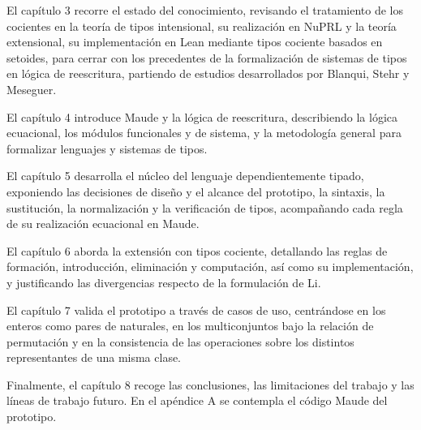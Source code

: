 El capítulo 3 recorre el estado del conocimiento, revisando el tratamiento de los cocientes en la teoría de tipos intensional, su realización en NuPRL y la teoría extensional, su implementación en Lean mediante tipos cociente basados en setoides, para cerrar con los precedentes de la formalización de sistemas de tipos en lógica de reescritura, partiendo de estudios desarrollados por Blanqui, Stehr y Meseguer.

El capítulo 4 introduce Maude y la lógica de reescritura, describiendo la lógica ecuacional, los módulos funcionales y de sistema, y la metodología general para formalizar lenguajes y sistemas de tipos.

El capítulo 5 desarrolla el núcleo del lenguaje dependientemente tipado, exponiendo las decisiones de diseño y el alcance del prototipo, la sintaxis, la sustitución, la normalización y la verificación de tipos, acompañando cada regla de su realización ecuacional en Maude.

El capítulo 6 aborda la extensión con tipos cociente, detallando las reglas de formación, introducción, eliminación y computación, así como su implementación, y justificando las divergencias respecto de la formulación de Li.

El capítulo 7 valida el prototipo a través de casos de uso, centrándose en los enteros como pares de naturales, en los multiconjuntos bajo la relación de permutación y en la consistencia de las operaciones sobre los distintos representantes de una misma clase.

Finalmente, el capítulo 8 recoge las conclusiones, las limitaciones del trabajo y las líneas de trabajo futuro. En el apéndice A se contempla el código Maude del prototipo.
